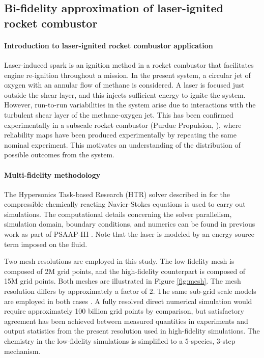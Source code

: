 \documentclass[preprint,10pt]{elsarticle}
\begin{document}
\subsection{Bi-fidelity approximation of laser-ignited rocket combustor}
\label{sec:exp:combustor}

\paragraph{Introduction to laser-ignited rocket combustor application}

Laser-induced spark is an ignition method in a rocket combustor that facilitates engine re-ignition throughout a mission. In the present system, a circular jet of oxygen with an annular flow of methane is considered. A laser is focused just outside the shear layer, and this injects sufficient energy to ignite the system. However, run-to-run variabilities in the system arise due to interactions with the turbulent shear layer of the methane-oxygen jet. This has been confirmed experimentally in a subscale rocket combustor (Purdue Propulsion, \cite{strelau2023modes}), where reliability maps have been produced experimentally by repeating the same nominal experiment. This motivates an understanding of the distribution of possible outcomes from the system.

\paragraph{Multi-fidelity methodology}

The Hypersonics Task-based Research (HTR) solver described in \citet{di2020htr} for the compressible chemically reacting Navier-Stokes equations is used to carry out simulations.  The computational details concerning the solver parallelism, simulation domain, boundary conditions, and numerics can be found in previous work as part of PSAAP-III \citep{wang2021progress, passiatore2024computational, zahtila2025bi}. Note that the laser is modeled by an energy source term imposed on the fluid.

Two mesh resolutions are employed in this study. The low-fidelity mesh is composed of 2M grid points, and the high-fidelity counterpart is composed of 15M grid points. Both meshes are illustrated in Figure \ref{fig:mesh}. The mesh resolution differs by approximately a factor of 2. The same sub-grid scale models are employed in both cases \citep{smagorinsky1963general}. A fully resolved direct numerical simulation would require approximately 100 billion grid points by comparison, but satisfactory agreement has been achieved between measured quantities in experiments and output statistics from the present resolution used in high-fidelity simulations. The chemistry in the low-fidelity simulations is simplified to a 5-species, 3-step mechanism. 
\end{document}
